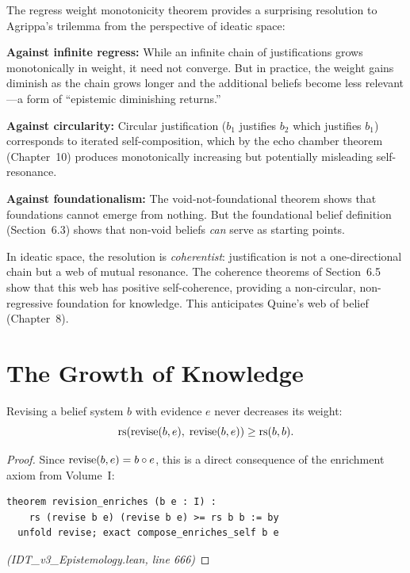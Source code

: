 \begin{interpretation}
The regress weight monotonicity theorem provides a surprising resolution to
Agrippa's trilemma from the perspective of ideatic space:

\textbf{Against infinite regress:} While an infinite chain of justifications
grows monotonically in weight, it need not converge. But in practice, the
weight gains diminish as the chain grows longer and the additional beliefs
become less relevant---a form of ``epistemic diminishing returns.''

\textbf{Against circularity:} Circular justification ($b_1$ justifies $b_2$
which justifies $b_1$) corresponds to iterated self-composition, which by the
echo chamber theorem (Chapter~10) produces monotonically increasing but
potentially misleading self-resonance.

\textbf{Against foundationalism:} The void-not-foundational theorem shows that
foundations cannot emerge from nothing. But the foundational belief definition
(Section~6.3) shows that non-void beliefs \emph{can} serve as starting points.

In ideatic space, the resolution is \emph{coherentist}: justification is not a
one-directional chain but a web of mutual resonance. The coherence theorems of
Section~6.5 show that this web has positive self-coherence, providing a
non-circular, non-regressive foundation for knowledge. This anticipates
Quine's web of belief (Chapter~8).
\end{interpretation}


\section{The Growth of Knowledge}

\begin{theorem}
\label{thm:revision-enriches}
Revising a belief system $b$ with evidence $e$ never decreases its weight:
\[
  \mathrm{rs}(\mathrm{revise}(b, e),\; \mathrm{revise}(b, e)) \geq \mathrm{rs}(b, b).
\]
\end{theorem}

\begin{proof}
Since $\mathrm{revise}(b, e) = b \circ e$, this is a direct consequence of
the enrichment axiom from Volume~I:
\begin{lstlisting}
theorem revision_enriches (b e : I) :
    rs (revise b e) (revise b e) >= rs b b := by
  unfold revise; exact compose_enriches_self b e
\end{lstlisting}
\textit{(IDT\_v3\_Epistemology.lean, line 666)}
\end{proof}

